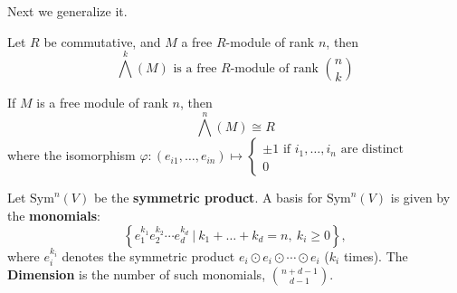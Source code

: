 \documentclass[openany]{book}
\newcommand{\Sym}{\text{Sym}} %
\begin{document}
Next we generalize it.
\begin{prop}
    Let $R$ be commutative, and $M$ a free $R$-module of rank $n$, then 
    \begin{equation*}
        \bigwedge^k(M) \text{ is a free $R$-module of rank }\binom{n}{k}
    \end{equation*}
\end{prop}

\begin{example}
    If $M$ is a free module of rank $n$, then 
    \begin{equation*}
        \bigwedge^n(M)\cong R
    \end{equation*}
    where the isomorphism $\varphi: (e_{i1},\dots, e_{in})\mapsto\begin{cases}
        \pm 1 \text{ if $i_1,\dots, i_n$ are distinct}\\
        0
    \end{cases}$
\end{example}



\begin{prop}
    Let $\text{Sym}^n(V)$ be the \textbf{symmetric product}. A basis for $\Sym^n(V)$ is given by the \textbf{monomials}:
\[
\left\{ e_1^{k_1} e_2^{k_2} \cdots e_d^{k_d} \ \Bigg| \ k_1+\dots+k_d = n, \ k_i \geq 0 \right\},
\]
where $e_i^{k_i}$ denotes the symmetric product $e_i \odot e_i \odot \cdots \odot e_i$ ($k_i$ times). The 
\textbf{Dimension} is the number of such monomials, $\binom{n + d - 1}{d - 1}$.
\end{prop}
\end{document}
